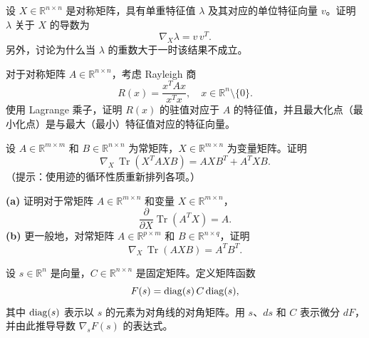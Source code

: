 \begin{exercise}
   设 $X\in\mathbb{R}^{n\times n}$ 是对称矩阵，具有单重特征值 $\lambda$ 及其对应的单位特征向量 $v$。证明 $\lambda$ 关于 $X$ 的导数为
   \[
      \nabla_X \lambda = v\,v^T.
   \]
   另外，讨论为什么当 $\lambda$ 的重数大于一时该结果不成立。
\end{exercise}

\begin{exercise}
   对于对称矩阵 $A\in\mathbb{R}^{n\times n}$，考虑 Rayleigh 商
   \[
      R(x) = \frac{x^T A x}{x^T x}, \quad x\in\mathbb{R}^n\setminus\{0\}.
   \]
   使用 Lagrange 乘子，证明 $R(x)$ 的驻值对应于 $A$ 的特征值，并且最大化点（最小化点）是与最大（最小）特征值对应的特征向量。
\end{exercise}
\begin{exercise}
   设 $A\in\mathbb{R}^{m\times m}$ 和 $B\in\mathbb{R}^{n\times n}$ 为常矩阵，$X\in\mathbb{R}^{m\times n}$ 为变量矩阵。证明
   \[
      \nabla_X\,\operatorname{Tr}(X^T A X B) = A X B^T + A^T X B.
   \]
   （提示：使用迹的循环性质重新排列各项。）
\end{exercise}

\begin{exercise}
   \textbf{(a)} 证明对于常矩阵 $A\in\mathbb{R}^{m\times n}$ 和变量 $X\in\mathbb{R}^{m\times n}$，
   \[
      \frac{\partial}{\partial X} \operatorname{Tr}(A^T X) = A.
   \]
   \textbf{(b)} 更一般地，对常矩阵 $A\in\mathbb{R}^{p\times m}$ 和 $B\in\mathbb{R}^{n\times q}$，证明
   \[
      \nabla_X\,\operatorname{Tr}(A X B) = A^T B^T.
   \]
\end{exercise}

\begin{exercise}
   设 $s\in\mathbb{R}^n$ 是向量，$C\in\mathbb{R}^{n\times n}$ 是固定矩阵。定义矩阵函数
   \[
      F(s) = \mathrm{diag}(s)\,C\,\mathrm{diag}(s),
   \]
   其中 $\mathrm{diag}(s)$ 表示以 $s$ 的元素为对角线的对角矩阵。用 $s$、$ds$ 和 $C$ 表示微分 $dF$，并由此推导导数 $\nabla_s F(s)$ 的表达式。
\end{exercise}

